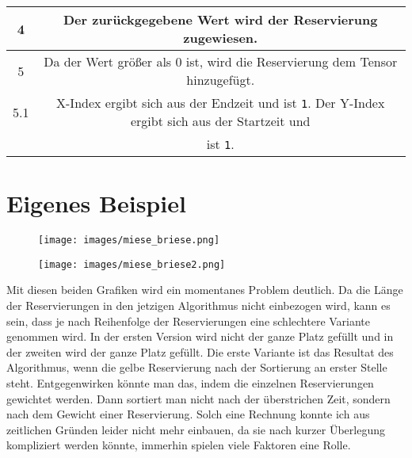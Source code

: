 \begin{table}[H]
\begin{tabular}{|c|c|}
        4 & Der zurückgegebene Wert wird der Reservierung zugewiesen. \\ \hline
        5 & Da der Wert größer als 0 ist, wird die Reservierung dem Tensor hinzugefügt. \\ \hline
        5.1 & X-Index ergibt sich aus der Endzeit und ist \texttt{1}.  Der Y-Index ergibt sich aus der Startzeit und \\& ist \texttt{1}. \\ \hline
    \end{tabular}
\end{table}

\section{Eigenes Beispiel}

\begin{figure}[H]
    \centering
    \texttt{[image: images/miese\_briese.png]}
\end{figure} \par

\begin{figure}[H]
    \centering
    \texttt{[image: images/miese\_briese2.png]}
\end{figure} \par

Mit diesen beiden Grafiken wird ein momentanes Problem deutlich. Da die Länge der Reservierungen in den jetzigen Algorithmus nicht einbezogen wird, kann es sein, dass je nach Reihenfolge der Reservierungen eine schlechtere Variante genommen wird. In der ersten Version wird nicht der ganze Platz gefüllt und in der zweiten wird der ganze Platz gefüllt. Die erste Variante ist das Resultat des Algorithmus, wenn die gelbe Reservierung nach der Sortierung an erster Stelle steht. Entgegenwirken könnte man das, indem die einzelnen Reservierungen gewichtet werden. Dann sortiert man nicht nach der überstrichen Zeit, sondern nach dem Gewicht einer Reservierung. Solch eine Rechnung konnte ich aus zeitlichen Gründen leider nicht mehr einbauen, da sie nach kurzer Überlegung kompliziert werden könnte, immerhin spielen viele Faktoren eine Rolle.

